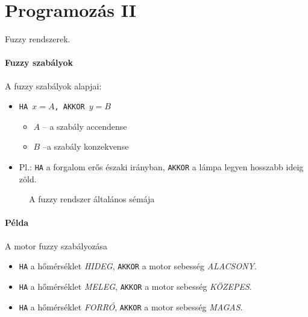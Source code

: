 \documentclass[../../main.tex]{subfiles}
\begin{document}
\section{Programozás II}

\begin{fulltheorem}
  Fuzzy rendszerek.
\end{fulltheorem}


\paragraph{Fuzzy szabályok} A fuzzy szabályok alapjai:
\begin{itemize}
  \item \texttt{HA $x = A$, AKKOR $y = B$}
        \begin{itemize}
          \item $A$ -- a szabály accendense
          \item $B$ --a szabály konzekvense
        \end{itemize}
  \item Pl.: \texttt{HA} a forgalom erős északi irányban,
        \texttt{AKKOR} a lámpa legyen hosszabb ideig zöld.
\end{itemize}

\begin{figure}[htb]
  \centering
  \caption{A fuzzy rendszer általános sémája}
  \label{fig:fuzzy-scheme}
\end{figure}

\paragraph{Példa} A motor fuzzy szabályozása
\begin{itemize}
  \item \texttt{HA} a hőmérséklet \textit{HIDEG},
        \texttt{AKKOR} a motor sebesség \textit{ALACSONY}.
  \item \texttt{HA} a hőmérséklet \textit{MELEG},
        \texttt{AKKOR} a motor sebesség \textit{KÖZEPES}.
  \item \texttt{HA} a hőmérséklet \textit{FORRÓ},
        \texttt{AKKOR} a motor sebesség \textit{MAGAS}.
\end{itemize}
\end{document}

